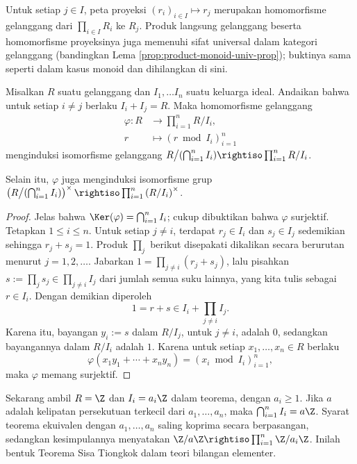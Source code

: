 Untuk setiap $j \in I$, peta proyeksi $(r_i)_{i \in I} \mapsto r_j$ merupakan homomorfisme gelanggang dari $\prod_{i \in I} R_i$ ke $R_j$. Produk langsung gelanggang beserta homomorfisme proyeksinya juga memenuhi sifat universal dalam kategori gelanggang (bandingkan Lema \ref{prop:product-monoid-univ-prop}); buktinya sama seperti dalam kasus monoid dan dihilangkan di sini.

\begin{theorem}\label{prop:CRT}
	Misalkan $R$ suatu gelanggang dan $I_1, \ldots I_n$ suatu keluarga ideal. Andaikan bahwa untuk setiap $i \neq j$ berlaku $I_i + I_j = R$. Maka homomorfisme gelanggang
	\begin{align*}
		\varphi: R & \longrightarrow \prod_{i=1}^n R/I_i, \\
		r & \longmapsto \left( r \bmod I_i \right)_{i=1}^n
	\end{align*}
	menginduksi isomorfisme gelanggang $R \big/ (\bigcap_{i=1}^n I_i) \rightiso \prod_{i=1}^n R/I_i$.
\end{theorem}
Selain itu, $\varphi$ juga menginduksi isomorfisme grup $\left( R \big/ (\bigcap_{i=1}^n I_i)\right)^\times \rightiso \prod_{i=1}^n \left(R/I_i\right)^\times$.
\begin{proof}
	Jelas bahwa $\Ker(\varphi) = \bigcap_{i=1}^n I_i$; cukup dibuktikan bahwa $\varphi$ surjektif. Tetapkan $1 \leq i \leq n$. Untuk setiap $j \neq i$, terdapat $r_j \in I_i$ dan $s_j \in I_j$ sedemikian sehingga $r_j + s_j = 1$. Produk $\prod_j$ berikut disepakati dikalikan secara berurutan menurut $j=1,2,\ldots$. Jabarkan $1 = \prod_{j \neq i} (r_j + s_j)$, lalu pisahkan $s := \prod_j s_j \in \prod_{j \neq i} I_j$ dari jumlah semua suku lainnya, yang kita tulis sebagai $r \in I_i$. Dengan demikian diperoleh
	\[ 1 = r + s \in I_i + \prod_{j \neq i} I_j. \]
	Karena itu, bayangan $y_i := s$ dalam $R/I_j$, untuk $j \neq i$, adalah $0$, sedangkan bayangannya dalam $R/I_i$ adalah $1$. Karena untuk setiap $x_1, \ldots, x_n \in R$ berlaku
	\[ \varphi(x_1 y_1 + \cdots + x_n y_n) = (x_i \bmod I_i)_{i=1}^n, \]
	maka $\varphi$ memang surjektif.
\end{proof}

Sekarang ambil $R=\Z$ dan $I_i = a_i \Z$ dalam teorema, dengan $a_i \geq 1$. Jika $a$ adalah kelipatan persekutuan terkecil dari $a_1, \ldots, a_n$, maka $\bigcap_{i=1}^n I_i = a\Z$. Syarat teorema ekuivalen dengan $a_1, \ldots, a_n$ saling koprima secara berpasangan, sedangkan kesimpulannya menyatakan $\Z/a\Z \rightiso \prod_{i=1}^n \Z/a_i\Z$. Inilah bentuk Teorema Sisa Tiongkok dalam teori bilangan elementer.

